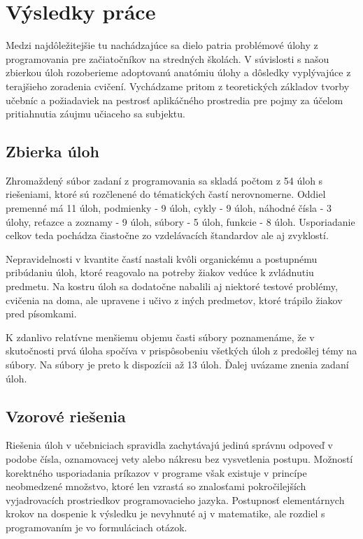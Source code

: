 \chapter{Výsledky práce}
Medzi najdôležitejšie tu nachádzajúce sa dielo patria problémové úlohy z programovania pre začiatočníkov na stredných školách. V súvislosti s našou zbierkou úloh rozoberieme adoptovanú anatómiu úlohy a dôsledky vyplývajúce z terajšieho zoradenia cvičení. Vychádzame pritom z teoretických základov tvorby učebníc a požiadaviek na pestrosť aplikáčného prostredia pre pojmy za účelom pritiahnutia záujmu učiaceho sa subjektu.

\section{Zbierka úloh}
Zhromaždený súbor zadaní z programovania sa skladá počtom z 54 úloh s riešeniami, ktoré sú rozčlenené do tématických častí nerovnomerne. Oddiel premenné má 11 úloh, podmienky - 9 úloh, cykly - 9 úloh, náhodné čísla - 3 úlohy, reťazce a zoznamy - 9 úloh, súbory - 5 úloh, funkcie - 8 úloh. Usporiadanie celkov teda pochádza čiastočne zo vzdelávacích štandardov ale aj zvyklostí.

Nepravidelnosti v kvantite častí nastali kvôli organickému a postupnému pribúdaniu úloh, ktoré reagovalo na potreby žiakov vedúce k zvládnutiu predmetu. Na kostru úloh sa dodatočne nabalili aj niektoré testové problémy, cvičenia na doma, ale upravene i učivo z iných predmetov, ktoré trápilo žiakov pred písomkami. 

K zdanlivo relatívne menšiemu objemu časti súbory poznamenáme, že v skutočnosti prvá úloha spočíva v prispôsobeniu všetkých úloh z predošlej témy na súbory. Na súbory je preto k dispozícii až 13 úloh. Ďalej uvázame znenia zadaní úloh.









\section{Vzorové riešenia}
Riešenia úloh v učebniciach spravidla zachytávajú jedinú správnu odpoveď v podobe čísla, oznamovacej vety alebo nákresu bez vysvetlenia postupu. Možností korektného usporiadania príkazov v programe však existuje v princípe neobmedzené množstvo, ktoré len vzrastá so znalosťami pokročilejších vyjadrovacích prostriedkov programovacieho jazyka. Postupnosť elementárnych krokov na dospenie k výsledku je nevyhnuté aj v matematike, ale rozdiel s programovaním je vo formuláciach otázok. 

